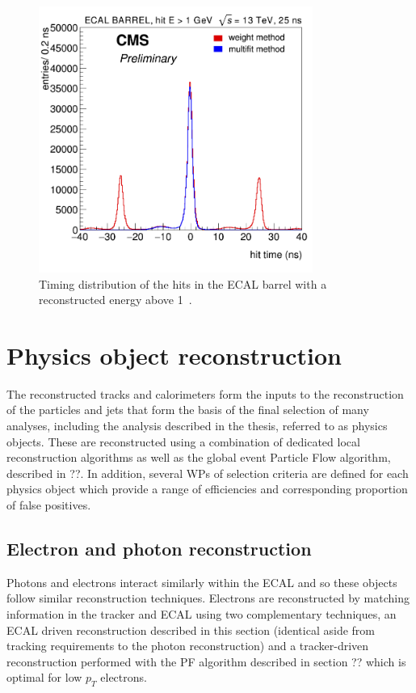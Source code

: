 \begin{figure}
\centering
    \includegraphics[width=0.8\textwidth]{./Figures/reconstruction/timing_barrel_linear.png}
  \caption{Timing distribution of the hits in the ECAL barrel with a reconstructed energy above 1\GeV~\cite{ecal_timing}.}
  \label{fig:timing_barrel_linear}
\end{figure}

\section{Physics object reconstruction}

The reconstructed tracks and calorimeters form the inputs to the reconstruction of the particles and 
jets that form the basis of the final selection of many analyses, including the analysis described 
in the thesis, referred to as physics objects. These are reconstructed using a combination of
dedicated local reconstruction algorithms as well as the global event Particle Flow algorithm, described in ??.
In addition, several WPs of selection criteria are defined for each physics object 
which provide a range of efficiencies and corresponding proportion of false positives. 

\subsection{Electron and photon reconstruction}

Photons and electrons interact similarly within the ECAL and so these objects follow similar reconstruction techniques.
Electrons are reconstructed by matching information in the tracker and ECAL
using two complementary techniques, an ECAL driven reconstruction described in this section (identical aside from tracking requirements
to the photon reconstruction) and a tracker-driven reconstruction performed with the PF algorithm described in section ??
which is optimal for low $p_T$ electrons. 

